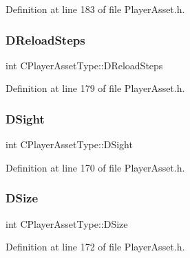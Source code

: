 Definition at line 183 of file Player\+Asset.\+h.

\hypertarget{classCPlayerAssetType_a192d6ac421608663d18d1a0cda00841e}{}\label{classCPlayerAssetType_a192d6ac421608663d18d1a0cda00841e} 
\subsubsection{\texorpdfstring{D\+Reload\+Steps}{DReloadSteps}}
{\footnotesize\ttfamily int C\+Player\+Asset\+Type\+::\+D\+Reload\+Steps\hspace{0.3cm}{\ttfamily [protected]}}



Definition at line 179 of file Player\+Asset.\+h.

\hypertarget{classCPlayerAssetType_afa32c3f45737443299a4e681dfe64911}{}\label{classCPlayerAssetType_afa32c3f45737443299a4e681dfe64911} 
\subsubsection{\texorpdfstring{D\+Sight}{DSight}}
{\footnotesize\ttfamily int C\+Player\+Asset\+Type\+::\+D\+Sight\hspace{0.3cm}{\ttfamily [protected]}}



Definition at line 170 of file Player\+Asset.\+h.

\hypertarget{classCPlayerAssetType_a00e59fe19f83fe37f23341c05010dbc2}{}\label{classCPlayerAssetType_a00e59fe19f83fe37f23341c05010dbc2} 
\subsubsection{\texorpdfstring{D\+Size}{DSize}}
{\footnotesize\ttfamily int C\+Player\+Asset\+Type\+::\+D\+Size\hspace{0.3cm}{\ttfamily [protected]}}



Definition at line 172 of file Player\+Asset.\+h.

\hypertarget{classCPlayerAssetType_a0e72be67119e97fb64a6036cd5da8d1a}{}\label{classCPlayerAssetType_a0e72be67119e97fb64a6036cd5da8d1a} 
